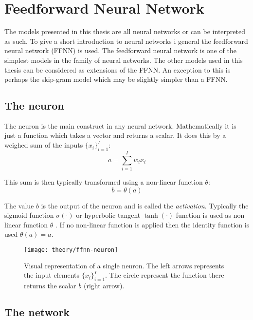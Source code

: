 
\section{Feedforward Neural Network}

The models presented in this thesis are all neural networks or can be interpreted as such. To give a short introduction to neural networks i general the feedforward neural network (FFNN) is used. The feedforward neural network is one of the simplest models in the family of neural networks. The other models used in this thesis can be considered as extensions of the FFNN. An exception to this is perhaps the skip-gram model which may be slightly simpler than a FFNN.

\subsection{The neuron}

The neuron is the main construct in any neural network. Mathematically it is just a function which takes a vector and returns a scalar. It does this by a weighed sum of the inputs $\{ x_i \}_{i=1}^I$:
\begin{equation}
a = \sum_{i=1}^I w_{i} x_i
\end{equation}

This sum is then typically transformed using a non-linear function $\theta$:
\begin{equation}
b = \theta(a)
\end{equation}

The value $b$ is the output of the neuron and is called the \textit{activation}. Typically the sigmoid function $\sigma(\cdot)$ or hyperbolic tangent $\tanh(\cdot)$ function is used as non-linear function $\theta$ \cite{bishop}. If no non-linear function is applied then the identity function is used $\theta(a) = a$.

\begin{figure}[H]
	\centering
	\texttt{[image: theory/ffnn-neuron]}
	\caption{Visual representation of a single neuron. The left arrows represents the input elements $\{ x_i \}_{i=1}^I$. The circle represent the function there returns the scalar $b$ (right arrow).}
\end{figure}

\subsection{The network}

